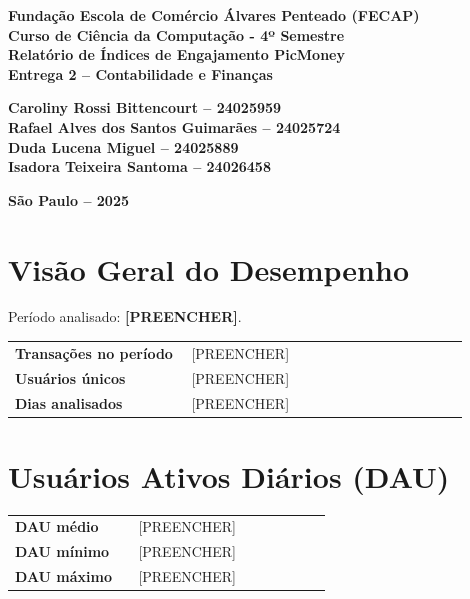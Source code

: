 \documentclass[12pt]{article}
\providecommand{\Periodo}{[PREENCHER]}
\providecommand{\TransacoesPeriodo}{[PREENCHER]}
\providecommand{\UsuariosUnicos}{[PREENCHER]}
\providecommand{\DiasAnalisados}{[PREENCHER]}
\providecommand{\DAUmedio}{[PREENCHER]}
\providecommand{\DAUmin}{[PREENCHER]}
\providecommand{\DAUmax}{[PREENCHER]}
\begin{document}
\begin{center}
\textbf{Fundação Escola de Comércio Álvares Penteado (FECAP)}\\
\textbf{Curso de Ciência da Computação - 4º Semestre}\\[2cm]

\vspace*{\fill}
\textbf{\Large Relatório de Índices de Engajamento PicMoney}\\[0.5cm]
\textbf{Entrega 2 – Contabilidade e Finanças}\\[2cm]
\end{center}

\noindent\hspace*{6cm}\textbf{Caroliny Rossi Bittencourt – 24025959}\\
\hspace*{6cm}\textbf{Rafael Alves dos Santos Guimarães – 24025724}\\
\hspace*{6cm}\textbf{Duda Lucena Miguel – 24025889}\\
\hspace*{6cm}\textbf{Isadora Teixeira Santoma – 24026458}\\[2cm]

\vspace*{\fill}
\begin{center}
\vfill
\textbf{São Paulo – 2025}
\end{center}
\newpage
\onehalfspacing


\section*{Visão Geral do Desempenho}
Período analisado: \textbf{\Periodo}.

\begin{center}
\begin{tabular}{>{\bfseries}p{0.35\linewidth} p{0.55\linewidth}}
\toprule
Transações no período & \TransacoesPeriodo \\
Usuários únicos & \UsuariosUnicos \\
Dias analisados & \DiasAnalisados \\
\bottomrule
\end{tabular}
\end{center}

\section*{Usuários Ativos Diários (DAU)}
\begin{center}
\begin{tabular}{>{\bfseries}p{0.35\linewidth} p{0.55\linewidth}}
\toprule
DAU médio & \DAUmedio \\
DAU mínimo & \DAUmin \\
DAU máximo & \DAUmax \\
\bottomrule
\end{tabular}
\end{center}
\end{document}

